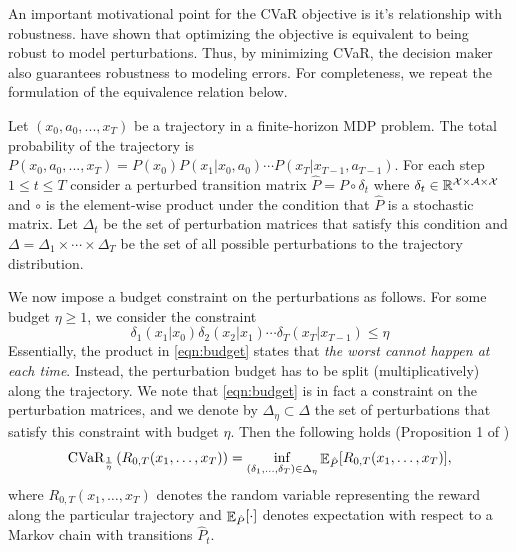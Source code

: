 An important motivational point for the CVaR objective  is it's relationship with robustness. \citet{chow2015risk} have shown that optimizing the objective is equivalent to being robust to model perturbations. Thus, by minimizing CVaR, the decision maker also guarantees robustness to modeling errors. For completeness, we repeat the formulation of the equivalence relation below.

Let $(x_0, a_0, ..., x_T)$ be a trajectory in a finite-horizon MDP problem. The total probability of the trajectory is $P(x_0, a_0, ..., x_T)=P(x_0)P(x_1|x_0,a_0)\cdots P(x_T|x_{T-1}, a_{T-1})$. For each step $1\le t\le T$ consider a perturbed transition matrix $\hat{P} = P \circ \delta_t$ where $\delta_t \in \mathbb{R}^{\mathcal{X}\times\mathcal{A}\times\mathcal{X}}$ and $\circ$ is the element-wise product under the condition that $\hat{P}$ is a stochastic matrix. Let $\Delta_t$ be the set of perturbation matrices that satisfy this condition and $\Delta = \Delta_1 \times \cdots \times \Delta_T$ be the set of all possible perturbations to the trajectory distribution.

We now impose a budget constraint on the perturbations as follows. For some budget $\eta \geq 1$, we consider the constraint
\begin{equation}\label{eqn:budget}
    \delta_1(x_1|x_0)\delta_2(x_2|x_1)\cdots \delta_T(x_T|x_{T-1}) \leq \eta
\end{equation}
Essentially, the product in \eqref{eqn:budget} states that \emph{the worst cannot happen at each time}. Instead, the perturbation budget has to be split (multiplicatively) along the trajectory. We note that \eqref{eqn:budget} is in fact a constraint on the perturbation matrices, and we denote by $\Delta_\eta \subset \Delta$ the set of perturbations that satisfy this constraint with budget $\eta$.
Then the following holds (Proposition 1 of \citep{chow2015risk})
\begin{equation}\label{eq:CVaR_is_robustness}
    \text{CVaR}_{\frac{1}{\eta}} \left(R_{0,T}(x_1,\dots,x_T)\right) = \inf_{(\delta_1,\dots,\delta_T)\in \Delta_{\eta}} \mathop{\mathbb{E}}\nolimits_{\hat{P}}[R_{0,T}(x_1,\dots,x_T)],
\end{equation}
where $R_{0,T}(x_1,\dots,x_T)$ denotes the random variable representing the reward along the particular trajectory and $\mathop{\mathbb{E}}\nolimits_{\hat{P}}[\cdot]$ denotes expectation with respect to a Markov chain with transitions $\hat{P}_t$.





